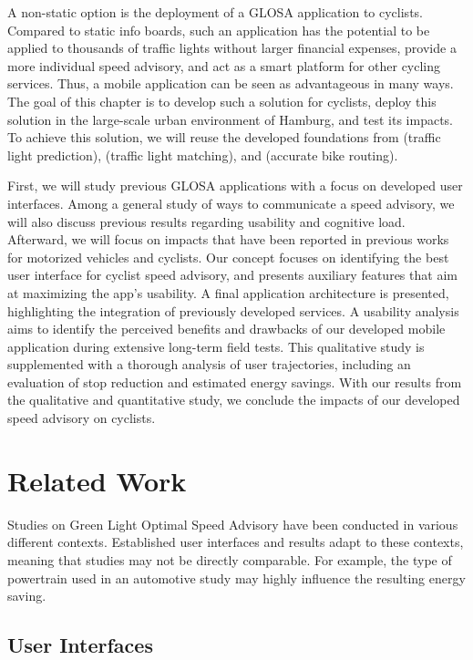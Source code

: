A non-static option is the deployment of a GLOSA application to cyclists. Compared to static info boards, such an application has the potential to be applied to thousands of traffic lights without larger financial expenses, provide a more individual speed advisory, and act as a smart platform for other cycling services. Thus, a mobile application can be seen as advantageous in many ways. The goal of this chapter is to develop such a solution for cyclists, deploy this solution in the large-scale urban environment of Hamburg, and test its impacts. To achieve this solution, we will reuse the developed foundations from  (traffic light prediction),  (traffic light matching), and  (accurate bike routing).

First, we will study previous GLOSA applications with a focus on developed user interfaces. Among a general study of ways to communicate a speed advisory, we will also discuss previous results regarding usability and cognitive load. Afterward, we will focus on impacts that have been reported in previous works for motorized vehicles and cyclists. Our concept focuses on identifying the best user interface for cyclist speed advisory, and presents auxiliary features that aim at maximizing the app's usability. A final application architecture is presented, highlighting the integration of previously developed services. A usability analysis aims to identify the perceived benefits and drawbacks of our developed mobile application during extensive long-term field tests. This qualitative study is supplemented with a thorough analysis of user trajectories, including an evaluation of stop reduction and estimated energy savings. With our results from the qualitative and quantitative study, we conclude the impacts of our developed speed advisory on cyclists. 

\section{Related Work}\label{sec:rw-uis}

Studies on Green Light Optimal Speed Advisory have been conducted in various different contexts. Established user interfaces and results adapt to these contexts, meaning that studies may not be directly comparable. For example, the type of powertrain used in an automotive study may highly influence the resulting energy saving. 

\subsection{User Interfaces}

